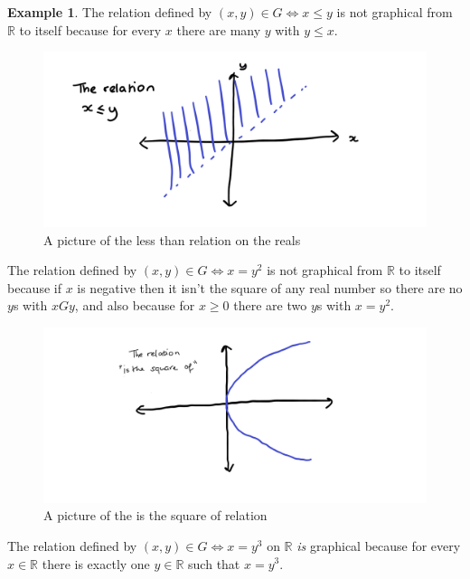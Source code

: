 \documentclass[
]{book}
\theoremstyle{definition}
\theoremstyle{definition}
\newtheorem{example}{Example}[chapter]
\theoremstyle{definition}
\theoremstyle{definition}
\theoremstyle{remark}
\begin{document}
\begin{example}

The relation defined by \((x,y) \in G \Leftrightarrow x \leq y\) is not graphical from \(\mathbb{R}\) to itself because for every \(x\) there are many \(y\) with \(y \leq x\).

\begin{figure}
\centering
\includegraphics{less than.png}
\caption{\label{fig:unnamed-chunk-6}A picture of the less than relation on the reals}
\end{figure}

The relation defined by \((x,y) \in G \Leftrightarrow x=y^2\) is not graphical from \(\mathbb{R}\) to itself because if \(x\) is negative then it isn't the square of any real number so there are no \(y\)s with \(x G y\), and also because for \(x \geq 0\) there are two \(y\)s with \(x=y^2\).

\begin{figure}
\centering
\includegraphics{is the square of.png}
\caption{\label{fig:unnamed-chunk-7}A picture of the is the square of relation}
\end{figure}

The relation defined by \((x,y) \in G \Leftrightarrow x=y^3\) on \(\mathbb{R}\) \emph{is} graphical because for every \(x \in \mathbb{R}\) there is exactly one \(y \in \mathbb{R}\) such that \(x=y^3\).


\end{example}
\end{document}
